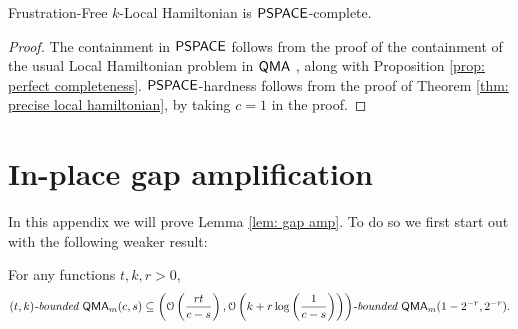 \documentclass[a4paper,UKenglish]{lipics-v2016}
\newcommand\QMA{{\sf{QMA}}}
\newcommand\PSPACE{{\sf{PSPACE}}}
\newcommand\bddQMA[5]{{\left(#1,#2\right)}\textit{-bounded }\QMA_{#3}(#4,#5)}
\begin{document}
\begin{theorem} \label{thm: frustration free}
Frustration-Free $k$-Local Hamiltonian is $\PSPACE$-complete.
\end{theorem}
\begin{proof}
The containment in $\PSPACE$ follows from the proof of the containment of the usual Local Hamiltonian problem in $\QMA$ \cite{ksv02}, along with Proposition \ref{prop: perfect completeness}. $\PSPACE$-hardness follows from the proof of Theorem \ref{thm: precise local hamiltonian}, by taking $c=1$ in the proof.
\end{proof}
\section{In-place gap amplification} \label{app: gap amplification}
In this appendix we will prove Lemma \ref{lem: gap amp}. To do so we first start out with the following weaker result:
\begin{lemma} \label{lem: gap amp 1}
For any functions $t,k,r>0$, 
\[
\bddQMA{t}{k}{m}{c}{s}\subseteq\bddQMA{\mathcal{O}\left(\frac{rt}{c-s}\right)}{\mathcal{O}\left(k+r\log\left(\frac{1}{c-s}\right)\right)}{m}{1-2^{-r}}{2^{-r}}.
\]
\end{lemma}
\end{document}
